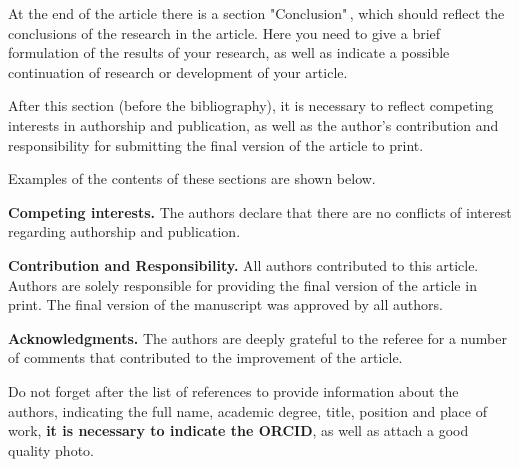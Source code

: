 \documentclass{mfitjournal-en}%
\begin{document}
At the end of the article there is a section "Conclusion"\,, which should reflect the conclusions of the research in the article. Here you need to give a brief formulation of the results of your research, as well as indicate a possible continuation of research or development of your article.

After this section (before the bibliography), it is necessary to reflect competing interests in authorship and publication, as well as the author's contribution and responsibility for submitting the final version of the article to print.

Examples of the contents of these sections are shown below.

{\bf Competing interests.} The authors declare that there are no conflicts of interest regarding authorship and publication.

{\bf Contribution and Responsibility.} All authors contributed to this article. Authors are solely responsible for providing the final version of the article in print. The final version of the manuscript was approved by all authors.

{\bf Acknowledgments.} The authors are deeply grateful to the referee for a number of comments that contributed to the improvement of the article.

Do not forget after the list of references to provide information about the authors, indicating the full name, academic degree, title, position and place of work, \textbf{it is necessary to indicate the ORCID}, as well as attach a good quality photo.
\end{document}
